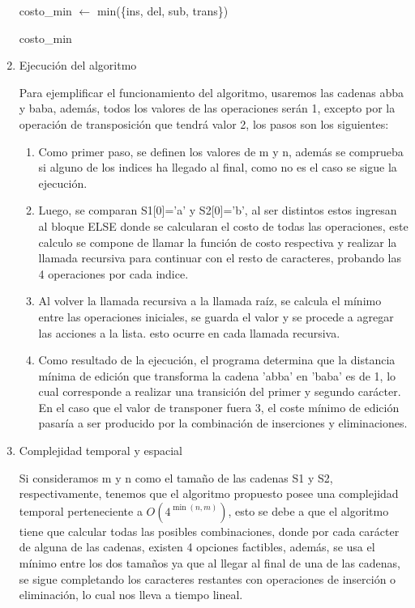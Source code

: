 \begin{enumerate}[1)]
\begin{algorithm}[H]
{        costo\_min $\leftarrow$ min(\{ins, del, sub, trans\})\;
    
        \Return costo\_min\;
    }


\end{algorithm}

\item Ejecución del algoritmo

Para ejemplificar el funcionamiento del algoritmo, usaremos las cadenas
abba y baba, además, todos los valores de las operaciones serán 1, excepto
por la operación de transposición que tendrá valor 2, los pasos son los siguientes:


\begin{enumerate}[1)]
    \item Como primer paso, se definen los valores de m y n, además se comprueba si alguno de los 
indices ha llegado al final, como no es el caso se sigue la ejecución.

\item Luego, se comparan S1[0]='a' y S2[0]='b', al ser distintos estos ingresan al bloque ELSE 
donde se calcularan el costo de todas las operaciones, este calculo se compone de llamar la función de costo 
respectiva y realizar la llamada recursiva para continuar con el resto de caracteres, 
probando las 4 operaciones por cada indice.

\item Al volver la llamada recursiva a la llamada raíz, se calcula el mínimo
entre las operaciones iniciales, se guarda el valor y se procede a agregar las
acciones a la lista. esto ocurre en cada llamada recursiva.

\item Como resultado de la ejecución, el programa determina que la distancia mínima de edición
que transforma la cadena 'abba' en 'baba' es de 1, lo cual corresponde a realizar una
transición del primer y segundo carácter. En el caso que el valor de transponer fuera 3, el coste mínimo de edición
pasaría a ser producido por la combinación de inserciones y eliminaciones.


\end{enumerate}

\item Complejidad temporal y espacial

Si consideramos m y n como el tamaño de las cadenas S1 y S2, 
respectivamente, tenemos que
el algoritmo propuesto posee una complejidad temporal 
perteneciente a $O\left(4^{\min(n, m)}\right)$, esto
se debe a que el algoritmo tiene que calcular todas las posibles
combinaciones, donde por cada carácter de alguna de las cadenas, existen
4 opciones factibles, además, se usa el mínimo entre los dos tamaños ya que
al llegar al final de una de las cadenas, se sigue completando los caracteres
restantes con operaciones de inserción o eliminación, 
lo cual nos lleva a tiempo lineal.


\end{enumerate}
